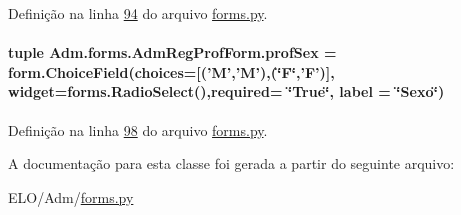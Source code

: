 Definição na linha \hyperlink{Adm_2forms_8py_source_l00094}{94} do arquivo \hyperlink{Adm_2forms_8py_source}{forms.\-py}.

\hypertarget{classAdm_1_1forms_1_1AdmRegProfForm_ab910e0448e7d6dac759c1cdcb24a4314}{
\paragraph[{prof\-Sex}]{\setlength{\rightskip}{0pt plus 5cm}tuple Adm.\-forms.\-Adm\-Reg\-Prof\-Form.\-prof\-Sex = form.\-Choice\-Field(choices=\mbox{[}('M','M'),(\char`\"{}F\char`\"{},'F')\mbox{]}, widget=forms.\-Radio\-Select(),required= \char`\"{}True\char`\"{}, label = \char`\"{}Sexo\char`\"{})\hspace{0.3cm}{\ttfamily [static]}}}\label{classAdm_1_1forms_1_1AdmRegProfForm_ab910e0448e7d6dac759c1cdcb24a4314}


Definição na linha \hyperlink{Adm_2forms_8py_source_l00098}{98} do arquivo \hyperlink{Adm_2forms_8py_source}{forms.\-py}.



A documentação para esta classe foi gerada a partir do seguinte arquivo\-:\begin{DoxyCompactItemize}
\item 
E\-L\-O/\-Adm/\hyperlink{Adm_2forms_8py}{forms.\-py}\end{DoxyCompactItemize}
